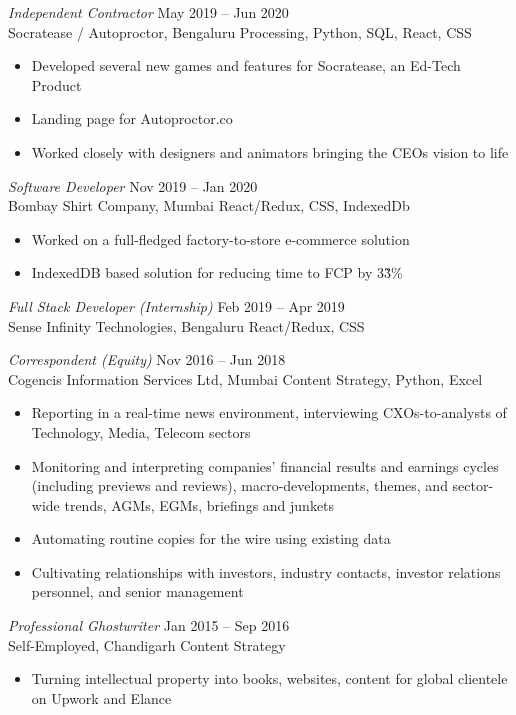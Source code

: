\documentclass[margin, 10pt]{res} %
\begin{document}
\begin{resume}
{\sl Independent Contractor} \hfill May 2019 – Jun 2020 \\
Socratease / Autoproctor, Bengaluru \hfill {\scriptsize Processing, Python, SQL, React, CSS}
\begin{itemize}
\item Developed several new games and features for Socratease, an Ed-Tech Product
\item Landing page for Autoproctor.co
\item Worked closely with designers and animators bringing the CEOs vision to life 
\end{itemize}

{\sl Software Developer} \hfill Nov 2019 – Jan 2020 \\
Bombay Shirt Company, Mumbai \hfill {\scriptsize React/Redux, CSS, IndexedDb}
\begin{itemize}
\item Worked on a full-fledged factory-to-store e-commerce solution
\item IndexedDB based solution for reducing time to FCP by 3\~3\%
\end{itemize}
{\sl Full Stack Developer (Internship)} \hfill Feb 2019 – Apr 2019 \\
Sense Infinity Technologies, Bengaluru \hfill {\scriptsize React/Redux, CSS}

{\sl Correspondent (Equity)} \hfill Nov 2016 – Jun 2018 \\
Cogencis Information Services Ltd, Mumbai \hfill {\scriptsize Content Strategy, Python, Excel}
\begin{itemize}
\item Reporting in a real-time news environment, interviewing CXOs-to-analysts of Technology, Media, Telecom sectors
\item Monitoring and interpreting companies’ financial results and earnings cycles (including previews and reviews), macro-developments, themes, and sector-wide trends, AGMs, EGMs, briefings and junkets
\item Automating routine copies for the wire using existing data
\item Cultivating relationships with investors, industry contacts, investor relations personnel, and senior management

\end{itemize}

{\sl Professional Ghostwriter} \hfill Jan 2015 – Sep 2016 \\
Self-Employed, Chandigarh \hfill {\scriptsize Content Strategy}
\begin{itemize}
\item Turning intellectual property into books, websites, content for global clientele on Upwork and Elance
\end{itemize}


\end{resume}
\end{document}
